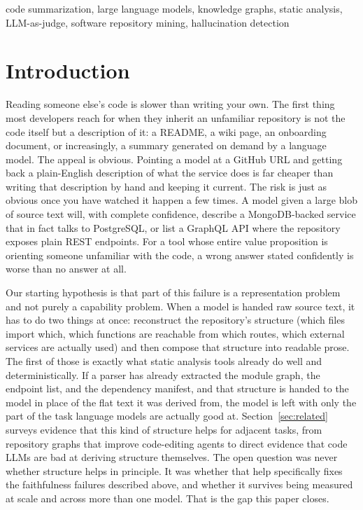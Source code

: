 \documentclass[conference]{IEEEtran}
\begin{document}
\begin{IEEEkeywords}
code summarization, large language models, knowledge graphs, static analysis, LLM-as-judge,
software repository mining, hallucination detection
\end{IEEEkeywords}

\section{Introduction}
\label{sec:intro}

Reading someone else's code is slower than writing your own. The first thing most developers
reach for when they inherit an unfamiliar repository is not the code itself but a description
of it: a README, a wiki page, an onboarding document, or increasingly, a summary generated on
demand by a language model. The appeal is obvious. Pointing a model at a GitHub URL and getting
back a plain-English description of what the service does is far cheaper than writing that
description by hand and keeping it current. The risk is just as obvious once you have watched
it happen a few times. A model given a large blob of source text will, with complete
confidence, describe a MongoDB-backed service that in fact talks to PostgreSQL, or list a
GraphQL API where the repository exposes plain REST endpoints. For a tool whose entire value
proposition is orienting someone unfamiliar with the code, a wrong answer stated confidently is
worse than no answer at all.

Our starting hypothesis is that part of this failure is a representation problem and not purely
a capability problem. When a model is handed raw source text, it has to do two things at once:
reconstruct the repository's structure (which files import which, which functions are reachable
from which routes, which external services are actually used) and then compose that structure
into readable prose. The first of those is exactly what static analysis tools already do well
and deterministically. If a parser has already extracted the module graph, the endpoint list,
and the dependency manifest, and that structure is handed to the model in place of the flat text
it was derived from, the model is left with only the part of the task language models are
actually good at. Section~\ref{sec:related} surveys evidence that this kind of structure helps
for adjacent tasks, from repository graphs that improve code-editing agents to direct evidence
that code LLMs are bad at deriving structure themselves. The open question was never whether
structure helps in principle. It was whether that help specifically fixes the faithfulness
failures described above, and whether it survives being measured at scale and across more than
one model. That is the gap this paper closes.
\end{document}
